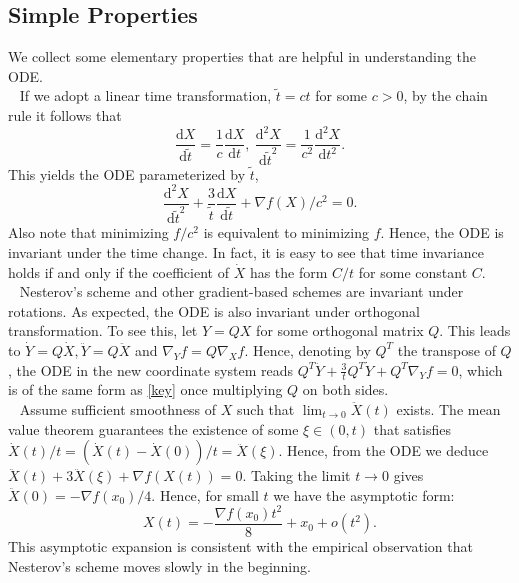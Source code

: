 \documentclass[twoside,11pt]{article}
\newcommand{\dder}[1]{\ddot #1}
\newcommand{\goto}{\rightarrow}
\renewcommand{\d}{{\mathrm{d}}}
\begin{document}
\subsection{Simple Properties}
We collect some elementary properties that are helpful in understanding the ODE.
\\
~ If we adopt a linear time transformation, $\tilde t = ct$ for some $c > 0$, by the chain rule it follows that
\begin{equation*}
\frac{\d X}{\d \tilde t} = \frac{1}{c}\frac{\d X}{\d t}, ~ \frac{\d^2 X}{\d \tilde t^2} = \frac{1}{c^2}\frac{\d^2 X}{\d t^2}.
\end{equation*}
This yields the ODE parameterized by $\tilde t$,
\begin{equation}\nonumber
\frac{\d^2 X}{\d \tilde t^2} + \frac{3}{\tilde t}\frac{\d X}{\d \tilde t} + \nabla f(X)/c^2 = 0.
\end{equation}
Also note that minimizing $f/c^2$ is equivalent to minimizing $f$. Hence, the ODE is invariant under the time change. In fact, it is easy to see that time invariance holds if and only if the coefficient of $\dot X$ has the form $C/t$ for some constant $C$.
\\
~ Nesterov's scheme and other gradient-based schemes are invariant under rotations. As expected, the ODE is also invariant under orthogonal transformation. To see this, let $Y = QX$ for some orthogonal matrix $Q$. This leads to $\dot Y = Q\dot X, \ddot Y = Q\ddot X$ and $\nabla_Y f = Q\nabla_X f$. Hence, denoting by $Q^T$ the transpose of $Q$, the ODE in the new coordinate system reads $Q^T\ddot Y + \frac{3}{t}Q^T\dot Y + Q^T\nabla_Yf = 0$, which is of the same form as \eqref{key} once multiplying $Q$ on both sides.
\\
~ Assume sufficient smoothness of $X$ such that $\lim_{t\goto 0} \ddot X(t)$ exists. The mean value theorem guarantees the existence of some $\xi\in(0, t)$ that satisfies $\dot X(t)/t = (\dot X(t) - \dot X(0))/t = \ddot X(\xi)$. Hence, from the ODE we deduce $\ddot X(t) + 3\dder{X}(\xi) + \nabla f(X(t)) = 0$. Taking the limit $t\goto 0$ gives $\ddot X(0) = -\nabla f(x_0)/4$. Hence, for small $t$ we have the asymptotic form:
\begin{equation}\nonumber
X(t) =  - \frac{\nabla f(x_0)t^2}{8} + x_0 + o(t^2).
\end{equation}
This asymptotic expansion is consistent with the empirical observation that Nesterov's scheme moves slowly in the beginning.
\end{document}
